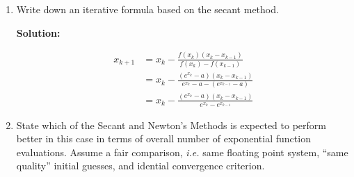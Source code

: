 \documentclass[12pt]{article}
\begin{document}
\begin{enumerate}
\begin{enumerate}
\begin{align*}
  g(x) &= \sum_{n=0}^{\infty}\frac{g^{(n)}\left( \widetilde{x}\right)}{n!}\left(x - \widetilde{x}\right)^{n}\\
  \intertext{For $n=0$ we get $g\left(\widetilde{x}\right) = 0$ and for $n=1$ we get $g^{\prime}\left(\widetilde{x}\right) = -1$, this changes our series to}
  g\left(x_{k}\right) &= 0 - \xi_{k} + \sum_{n=2}^{\infty} \frac{g^{(n)}\left(\widetilde{x}\right)}{n!}\xi_{k}^{n}
  \intertext{where we can replace this into the iterative equation from above, giving}
  x_{k+1} &= x_{k} - \xi_{k} + \sum_{n=2}^{\infty} \frac{g^{(n)}\left(\widetilde{x}\right)}{n!}\xi_{k}^{n}\\
          &= x_{k} - \xi_{k} + \xi_{k}^{2}\sum_{n=2}^{\infty} \frac{g^{(n)}\left(\widetilde{x}\right)}{n!}\xi_{k}^{n-2}\\
  \intertext{Finally, after subtracting $\widetilde{x}$ from both sides, gives}
  \xi_{k+1} = x_{k+1} - \widetilde{x} &= \xi_{k} - \xi_{k} + \xi_{k}^{2}\sum_{n=2}^{\infty} \frac{g^{(n)}\left(\widetilde{x}\right)}{n!}\xi_{k}^{n-2}\\
                              &= \xi_{k}^{2}\sum_{n=2}^{\infty} \frac{g^{(n)}\left(\widetilde{x}\right)}{n!}\xi_{k}^{n-2}
\end{align*}

So it is quadratically convergent.

\item Write down an iterative formula based on the secant method.

{\bf Solution:}

\begin{align*}
x_{k+1} &= x_{k} - \frac{f\left(x_{k}\right) \left(x_{k} - x_{k-1}\right)}{f\left(x_{k}\right) - f\left(x_{k-1}\right)}\\
        &= x_{k} - \frac{\left(e^{x_{k}} - a\right)\left(x_{k} - x_{k-1}\right)}{e^{x_{k}} - a - \left(e^{x_{k-1}} - a\right)}\\
        &= x_{k} - \frac{\left(e^{x_{k}} - a\right)\left(x_{k} - x_{k-1}\right)}{e^{x_{k}} - e^{x_{k-1}}}
\end{align*}

\item State which of the Secant and Newton's Methods is expected to perform better in
this case in terms of overall number of exponential function evaluations. Assume a fair
comparison, {\em i.e.} same floating point system, ``same quality'' initial guesses, and idential
convergence criterion.


\end{enumerate}
\end{enumerate}
\end{document}

